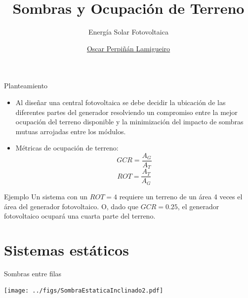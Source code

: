 \documentclass[aspectratio=169, usenames,svgnames,dvipsnames]{beamer}
\author{\href{https://oscarperpinan.github.io}{Oscar Perpiñán Lamigueiro}}
\date{}
\title{Sombras y Ocupación de Terreno}
\subtitle{Energía Solar Fotovoltaica}
\institute[UPM]{Universidad Politécnica de Madrid}
\begin{document}
\maketitle

\begin{frame}[label={sec:orge1db36b}]{Planteamiento}
\begin{itemize}
\item Al diseñar una central fotovoltaica se debe decidir la ubicación de las diferentes partes del generador resolviendo un \alert{compromiso} entre la mejor \alert{ocupación del terreno} disponible y la minimización del \alert{impacto de sombras mutuas} arrojadas entre los módulos.
\item Métricas de ocupación de terreno:
\[GCR = \frac{A_G}{A_T}\]
\[ROT = \frac{A_T}{A_G}\]
\end{itemize}
\begin{block}{Ejemplo}
Un sistema con un \(ROT = 4\) requiere un terreno de un área 4 veces el área del generador fotovoltaico. O, dado que \(GCR = 0.25\), el generador fotovoltaico ocupará una cuarta parte del terreno.
\end{block}
\end{frame}

\section{Sistemas estáticos}
\label{sec:org1754c58}

\begin{frame}[label={sec:org86ee7fb}]{Sombras entre filas}
\begin{center}
\texttt{[image: ../figs/SombraEstaticaInclinado2.pdf]}
\end{center}
\end{frame}
\end{document}

